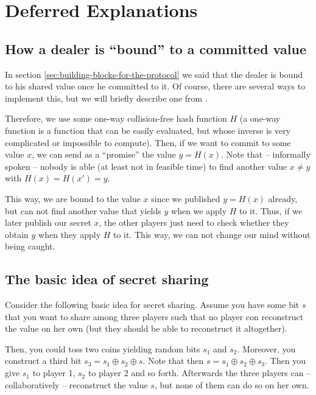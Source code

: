 \section{Deferred Explanations}
\label{sec:deferred-proofs}

\subsection{How a dealer is ``bound'' to a committed value}
\label{sec:dealer-bound-to-commited-value}

In section \ref{sec:building-blocks-for-the-protocol} we said that the dealer is bound to his shared value once he committed to it. Of course, there are several ways to implement this, but we will briefly describe one from \cite{lecture-notes-goldwasser-bellare}.

Therefore, we use some one-way collision-free hash function $H$ (a one-way function is a function that can be easily evaluated, but whose inverse is very complicated or impossible to compute). Then, if we want to commit to some value $x$, we can send as a ``promise'' the value $y=H(x)$. Note that -- informally spoken -- nobody is able (at least not in feasible time) to find another value $x\neq y$ with $H(x)=H(x')=y$.

This way, we are bound to the value $x$ since we published $y=H(x)$ already, but can not find another value that yields $y$ when we apply $H$ to it. Thus, if we later publish our secret $x$, the other players just need to check whether they obtain $y$ when they apply $H$ to it. This way, we can not change our mind without being caught.

\subsection{The basic idea of secret sharing}
\label{sec:appendix-basic-idea-secret-sharing}

Consider the following basic idea for secret sharing. Assume you have some bit $s$ that you want to share among three players such that no player con reconstruct the value on her own (but they should be able to reconstruct it altogether). 

Then, you could toss two coins yielding random bits $s_1$ and $s_2$. Moreover, you construct a third bit $s_3=s_1\oplus s_2\oplus s$. Note that then $s=s_1\oplus s_2 \oplus s_3$. Then you give $s_1$ to player 1, $s_2$ to player 2 and so forth. Afterwards the three players can -- collaboratively -- reconstruct the value $s$, but none of them can do so on her own.

